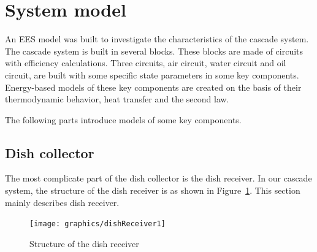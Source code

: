 \documentclass{article}
\begin{document}

\section{System model}
An EES model was built to investigate the characteristics of the cascade system. The cascade system is built in several blocks. These blocks are made of circuits with efficiency calculations. Three circuits, air circuit, water circuit and oil circuit, are built with some specific state parameters in some key components. Energy-based models of these key components are created on the basis of their thermodynamic behavior, heat transfer and the second law.

The following parts introduce models of some key components.

\subsection{Dish collector}
The most complicate part of the dish collector is the dish receiver. In our cascade system, the structure of the dish receiver is as shown in Figure~\ref{fig:dishReceiver}. This section mainly describes dish receiver.

\noindent \begin{figure}[htbp]
\begin{center}
	\texttt{[image: graphics/dishReceiver1]}
	\caption{Structure of the dish receiver}
	\label{fig:dishReceiver}
\end{center}
\end{figure}
\end{document}
